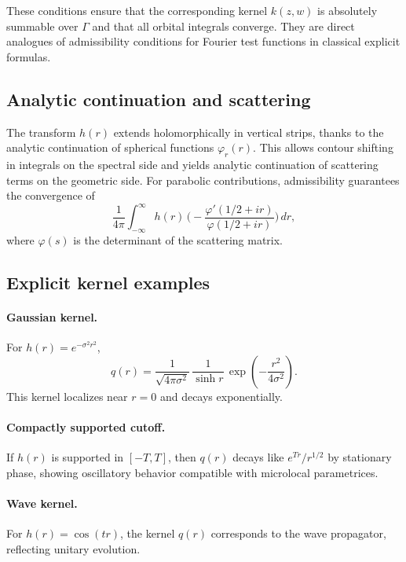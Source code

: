 \begin{remark}
These conditions ensure that the corresponding kernel $k(z,w)$ is absolutely summable over $\Gamma$ and that all orbital integrals converge. They are direct analogues of admissibility conditions for Fourier test functions in classical explicit formulas.
\end{remark}

\subsection{Analytic continuation and scattering}

The transform $h(r)$ extends holomorphically in vertical strips, thanks to the analytic continuation of spherical functions $\varphi_r(r)$.  
This allows contour shifting in integrals on the spectral side and yields analytic continuation of scattering terms on the geometric side.  
For parabolic contributions, admissibility guarantees the convergence of
\[
  \frac{1}{4\pi}\int_{-\infty}^\infty h(r)\,
    \Big(-\frac{\varphi'(1/2+ir)}{\varphi(1/2+ir)}\Big)\,dr,
\]
where $\varphi(s)$ is the determinant of the scattering matrix.

\subsection{Explicit kernel examples}

\paragraph{Gaussian kernel.}
For $h(r)=e^{-\sigma^2 r^2}$,
\[
  q(r) = \frac{1}{\sqrt{4\pi\sigma^2}}\,\frac{1}{\sinh r}\,
  \exp\!\left(-\frac{r^2}{4\sigma^2}\right).
\]
This kernel localizes near $r=0$ and decays exponentially.

\paragraph{Compactly supported cutoff.}
If $h(r)$ is supported in $[-T,T]$, then $q(r)$ decays like $e^{Tr}/r^{1/2}$ by stationary phase, showing oscillatory behavior compatible with microlocal parametrices.

\paragraph{Wave kernel.}
For $h(r)=\cos(tr)$, the kernel $q(r)$ corresponds to the wave propagator, reflecting unitary evolution.

